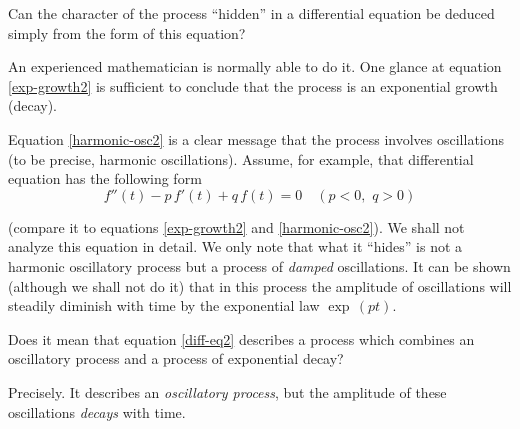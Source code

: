\rdr Can the character of the process ``hidden'' in a differential equation be deduced simply from the form of this equation?

\athr An experienced mathematician is normally able to do it. One glance at equation \eqref{exp-growth2} is sufficient to conclude that the process is an exponential growth (decay).

Equation \eqref{harmonic-osc2} is a clear message that the process involves oscillations (to be precise, harmonic oscillations). Assume, for example, that differential equation has the following form
\begin{equation}%
f''(t) - p\, f'(t) + q \, f(t)=0	\quad (p<0, \,\, q>0) 
\label{diff-eq2}
\end{equation}

(compare it to equations \eqref{exp-growth2} and \eqref{harmonic-osc2}). We shall not analyze this equation in detail. We only note that what it ``hides'' is not a harmonic oscillatory process but a process of \emph{damped} oscillations. It can be shown (although we shall not do it) that in this process the amplitude of oscillations will steadily diminish with time by the exponential law $\exp \, (pt)$.

\rdr Does it mean that equation \eqref{diff-eq2} describes a process which combines an oscillatory process and a process of exponential decay?

\athr Precisely. It describes an \emph{oscillatory process}, but the amplitude of these oscillations \emph{decays} with time.